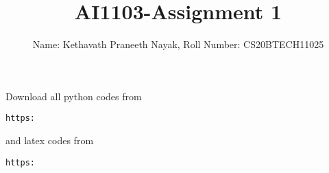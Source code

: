 \documentclass[journal,12pt,twocolumn]{IEEEtran}
\DeclareMathOperator*{\Res}{Res}
\begin{document}
\newcommand{\BEQA}{\begin{eqnarray}}
\newcommand{\EEQA}{\end{eqnarray}}
\newcommand{\define}{\stackrel{\triangle}{=}}

\raggedbottom
\setlength{\parindent}{0pt}
\providecommand{\mbf}{\mathbf}
\providecommand{\pr}[1]{\ensuremath{\Pr\left(#1\right)}}
\providecommand{\qfunc}[1]{\ensuremath{Q\left(#1\right)}}
\providecommand{\sbrak}[1]{\ensuremath{{}\left[#1\right]}}
\providecommand{\lsbrak}[1]{\ensuremath{{}\left[#1\right.}}
\providecommand{\rsbrak}[1]{\ensuremath{{}\left.#1\right]}}
\providecommand{\brak}[1]{\ensuremath{\left(#1\right)}}
\providecommand{\lbrak}[1]{\ensuremath{\left(#1\right.}}
\providecommand{\rbrak}[1]{\ensuremath{\left.#1\right)}}
\providecommand{\cbrak}[1]{\ensuremath{\left\{#1\right\}}}
\providecommand{\lcbrak}[1]{\ensuremath{\left\{#1\right.}}
\providecommand{\rcbrak}[1]{\ensuremath{\left.#1\right\}}}
\theoremstyle{remark}
\newtheorem{rem}{Remark}
\newcommand{\sgn}{\mathop{\mathrm{sgn}}}
\providecommand{\abs}[1]{\vert#1\vert}
\providecommand{\res}[1]{\Res\displaylimits_{#1}} 
\providecommand{\norm}[1]{\lVert#1\rVert}
\providecommand{\mtx}[1]{\mathbf{#1}}
\providecommand{\mean}[1]{E[ #1 ]}
\providecommand{\fourier}{\overset{\mathcal{F}}{ \rightleftharpoons}}
\providecommand{\system}{\overset{\mathcal{H}}{ \longleftrightarrow}}
\newcommand{\solution}{\noindent \textbf{Solution: }}
\newcommand{\cosec}{\,\text{cosec}\,}
\providecommand{\dec}[2]{\ensuremath{\overset{#1}{\underset{#2}{\gtrless}}}}
\newcommand{\myvec}[1]{\ensuremath{\begin{pmatrix}#1\end{pmatrix}}}
\newcommand{\mydet}[1]{\ensuremath{\begin{vmatrix}#1\end{vmatrix}}}
\makeatletter
{}
\makeatother
\let\StandardTheFigure\thefigure
\let\vec\mathbf
\renewcommand{\thefigure}{\theproblem}
\def\putbox#1#2#3{\makebox[0in][l]{\makebox[#1][l]{}\raisebox{\baselineskip}[0in][0in]{\raisebox{#2}[0in][0in]{#3}}}}
     \def\rightbox#1{\makebox[0in][r]{#1}}
     \def\centbox#1{\makebox[0in]{#1}}
     \def\topbox#1{\raisebox{-\baselineskip}[0in][0in]{#1}}
     \def\midbox#1{\raisebox{-0.5\baselineskip}[0in][0in]{#1}}
\vspace{3cm}
\title{AI1103-Assignment 1}
\author{Name: Kethavath Praneeth Nayak, Roll Number: CS20BTECH11025}
\maketitle
\newpage
\bigskip
\renewcommand{\thefigure}{\theenumi}
\renewcommand{\thetable}{\theenumi}
Download all python codes from 
\begin{lstlisting}
https:
\end{lstlisting}
%
and latex codes from 
%
\begin{lstlisting}
https:
\end{lstlisting}
\end{document}
